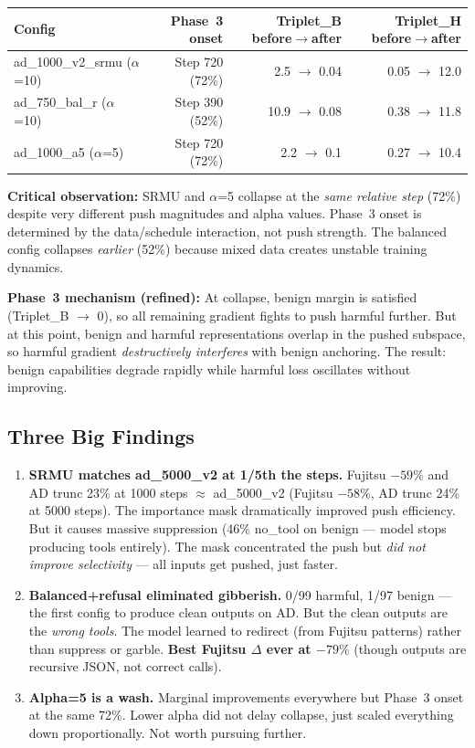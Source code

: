 \documentclass[11pt]{article}
\newcommand{\bad}[1]{\textcolor{bad}{#1}}
\begin{document}
\begin{center}
\small
\begin{tabular}{lrrr}
\toprule
Config & Phase~3 onset & Triplet\_B before$\to$after & Triplet\_H before$\to$after \\
\midrule
ad\_1000\_v2\_srmu ($\alpha$=10) & Step 720 (72\%) & 2.5 $\to$ 0.04 & 0.05 $\to$ 12.0 \\
ad\_750\_bal\_r ($\alpha$=10) & Step 390 (52\%) & 10.9 $\to$ 0.08 & 0.38 $\to$ 11.8 \\
ad\_1000\_a5 ($\alpha$=5) & Step 720 (72\%) & 2.2 $\to$ 0.1 & 0.27 $\to$ 10.4 \\
\bottomrule
\end{tabular}
\end{center}

\textbf{Critical observation:} SRMU and $\alpha$=5 collapse at the \emph{same
relative step} (72\%) despite very different push magnitudes and alpha values.
Phase~3 onset is determined by the data/schedule interaction, not push strength.
The balanced config collapses \emph{earlier} (52\%) because mixed data creates
unstable training dynamics.

\textbf{Phase~3 mechanism (refined):} At collapse, benign margin is satisfied
(Triplet\_B $\to$ 0), so all remaining gradient fights to push harmful further.
But at this point, benign and harmful representations overlap in the pushed
subspace, so harmful gradient \emph{destructively interferes} with benign
anchoring.  The result: benign capabilities degrade rapidly while harmful loss
oscillates without improving.

\subsection{Three Big Findings}

\begin{enumerate}
  \item \textbf{SRMU matches ad\_5000\_v2 at 1/5th the steps.} Fujitsu $-59\%$
        and AD trunc 23\% at 1000 steps $\approx$ ad\_5000\_v2 (Fujitsu $-58\%$,
        AD trunc 24\% at 5000 steps).  The importance mask dramatically improved
        push efficiency.  \bad{But it causes massive suppression} (46\% no\_tool
        on benign --- model stops producing tools entirely).  The mask concentrated
        the push but \emph{did not improve selectivity} --- all inputs get pushed,
        just faster.

  \item \textbf{Balanced+refusal eliminated gibberish.}  0/99 harmful, 1/97
        benign --- the first config to produce clean outputs on AD.  But the
        clean outputs are the \emph{wrong tools}.  The model learned to redirect
        (from Fujitsu patterns) rather than suppress or garble.
        \textbf{Best Fujitsu $\Delta$ ever at $-79\%$} (though outputs are
        recursive JSON, not correct calls).

  \item \textbf{Alpha=5 is a wash.}  Marginal improvements everywhere but
        Phase~3 onset at the same 72\%.  Lower alpha did not delay collapse,
        just scaled everything down proportionally.  Not worth pursuing further.
\end{enumerate}
\end{document}

